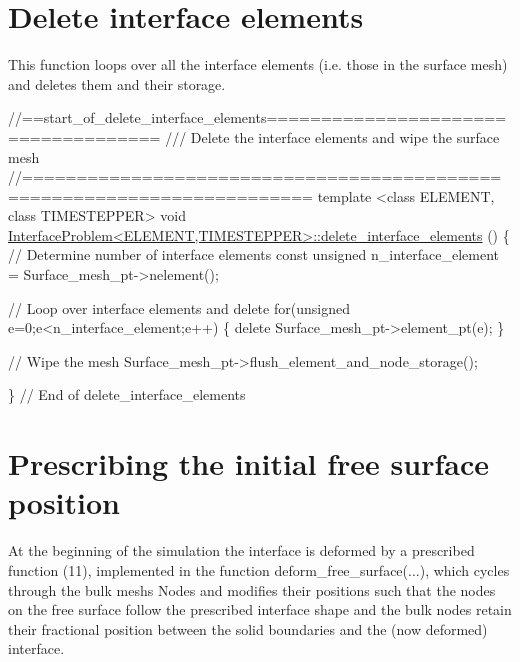  

\hypertarget{index_delete_interface_elements}{}\section{Delete interface elements}\label{index_delete_interface_elements}
This function loops over all the interface elements (i.\+e. those in the surface mesh) and deletes them and their storage.


\begin{DoxyCodeInclude}
\textcolor{comment}{//==start\_of\_delete\_interface\_elements====================================}
\textcolor{comment}{/// Delete the interface elements and wipe the surface mesh}
\textcolor{comment}{}\textcolor{comment}{//========================================================================}
\textcolor{keyword}{template} <\textcolor{keyword}{class} ELEMENT, \textcolor{keyword}{class} TIMESTEPPER>
\textcolor{keywordtype}{void} \hyperlink{classInterfaceProblem_ac2aaab086d9bbd3913ce8bc0d244413d}{InterfaceProblem<ELEMENT,TIMESTEPPER>::delete\_interface\_elements}
      ()
\{
 \textcolor{comment}{// Determine number of interface elements}
 \textcolor{keyword}{const} \textcolor{keywordtype}{unsigned} n\_interface\_element = Surface\_mesh\_pt->nelement();
 
 \textcolor{comment}{// Loop over interface elements and delete}
 \textcolor{keywordflow}{for}(\textcolor{keywordtype}{unsigned} e=0;e<n\_interface\_element;e++)
  \{
   \textcolor{keyword}{delete} Surface\_mesh\_pt->element\_pt(e);
  \}
 
 \textcolor{comment}{// Wipe the mesh}
 Surface\_mesh\_pt->flush\_element\_and\_node\_storage();
 
\} \textcolor{comment}{// End of delete\_interface\_elements}

\end{DoxyCodeInclude}




 

\hypertarget{index_deform_free_surface}{}\section{Prescribing the initial free surface position}\label{index_deform_free_surface}
At the beginning of the simulation the interface is deformed by a prescribed function (11), implemented in the function {\ttfamily deform\+\_\+free\+\_\+surface}(...), which cycles through the bulk mesh\textquotesingle{}s {\ttfamily Nodes} and modifies their positions such that the nodes on the free surface follow the prescribed interface shape and the bulk nodes retain their fractional position between the solid boundaries and the (now deformed) interface.



